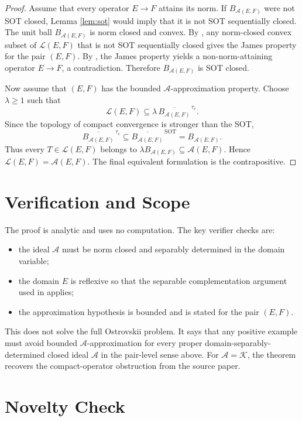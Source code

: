 \documentclass[11pt]{amsart}
\newcommand{\A}{\mathcal A}
\newcommand{\Lin}{\mathcal L}
\newcommand{\SOT}{\operatorname{SOT}}
\newcommand{\Ball}{B}
\begin{document}
\begin{proof}
Assume that every operator \(E\to F\) attains its norm.  If
\(\Ball_{\A(E,F)}\) were not SOT closed, Lemma \ref{lem:sot} would imply that it
is not SOT sequentially closed.  The unit ball \(\Ball_{\A(E,F)}\) is norm
closed and convex.  By \cite[Lemma 3.4]{DJM}, any norm-closed convex subset of
\(\Lin(E,F)\) that is not SOT sequentially closed gives the James property for
the pair \((E,F)\).  By \cite[Theorem A]{DJM}, the James property yields a
non-norm-attaining operator \(E\to F\), a contradiction.  Therefore
\(\Ball_{\A(E,F)}\) is SOT closed.

Now assume that \((E,F)\) has the bounded \(\A\)-approximation property.  Choose
\(\lambda\geq 1\) such that
\[
\Lin(E,F)\subseteq \lambda\,\overline{\Ball_{\A(E,F)}}^{\,\tau_c}.
\]
Since the topology of compact convergence is stronger than the SOT,
\[
\overline{\Ball_{\A(E,F)}}^{\,\tau_c}
\subseteq
\overline{\Ball_{\A(E,F)}}^{\,\SOT}
=\Ball_{\A(E,F)}.
\]
Thus every \(T\in\Lin(E,F)\) belongs to \(\lambda\Ball_{\A(E,F)}\subseteq
\A(E,F)\).  Hence \(\Lin(E,F)=\A(E,F)\).  The final equivalent formulation is
the contrapositive.
\end{proof}

\section{Verification and Scope}

The proof is analytic and uses no computation.  The key verifier checks are:

\begin{itemize}
\item the ideal \(\A\) must be norm closed and separably determined in the
domain variable;
\item the domain \(E\) is reflexive so that the separable complementation
argument used in \cite[Lemma 3.5]{DJM} applies;
\item the approximation hypothesis is bounded and is stated for the pair
\((E,F)\).
\end{itemize}

This does not solve the full Ostrovskii problem.  It says that any positive
example must avoid bounded \(\A\)-approximation for every proper
domain-separably-determined closed ideal \(\A\) in the pair-level sense above.
For \(\A=\mathcal K\), the theorem recovers the compact-operator obstruction
from the source paper.

\section{Novelty Check}
\end{document}
